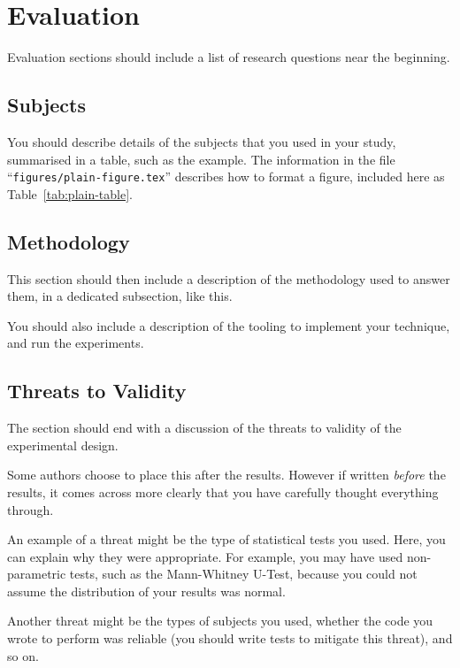 \section{Evaluation}
\label{sec:evaluation}

Evaluation sections should include a list of
research questions near the beginning.


\subsection{Subjects}
\label{sec:subjects}

You should describe details of the subjects that 
you used in your study, summarised in a table,
such as the example. 
The information in the file 
``{\tt figures/plain-figure.tex}''
describes how to format a figure, included here as
Table~\ref{tab:plain-table}.



\subsection{Methodology}
\label{sec:methodology}

This section should then include a description of
the methodology used to answer them, in a dedicated
subsection, like this. 

You should also include a description of the tooling
to implement your technique, and run the experiments.



\subsection{Threats to Validity}
\label{sec:threats-to-validity}

The section should end with a discussion of the threats
to validity of the experimental design.

Some authors choose to place this after the results.
However if written {\em before} the results, it comes
across more clearly that you have carefully thought
everything through.

An example of a threat might be the type of 
statistical tests you used. Here, you can explain
why they were appropriate. For example, you may
have used non-parametric tests, such as the 
Mann-Whitney U-Test, because you could not assume
the distribution of your results was normal.

Another threat might be the types of subjects you
used, whether the code you wrote to perform was 
reliable (you should write tests to mitigate this
threat), and so on.
